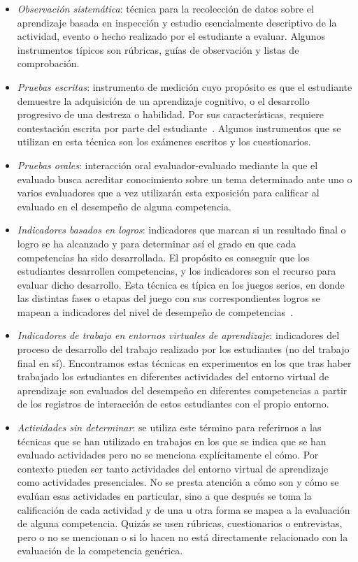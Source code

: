 \begin{itemize}
\item \emph{Observación sistemática}: técnica para la recolección de datos sobre el aprendizaje basada en inspección y estudio esencialmente descriptivo de la actividad, evento o hecho realizado por el estudiante a evaluar.  Algunos instrumentos típicos son rúbricas, guías de observación y listas de comprobación.
\item \emph{Pruebas escritas}: instrumento de medición cuyo propósito es que el estudiante demuestre la adquisición de un aprendizaje cognitivo, o el desarrollo progresivo de una destreza o habilidad. Por sus características, requiere contestación escrita por parte del estudiante~\cite{rojas2008prueba}. Algunos instrumentos que se utilizan en esta técnica son los exámenes escritos y los cuestionarios.
\item \emph{Pruebas orales}: interacción oral evaluador-evaluado mediante la que el evaluado busca acreditar conocimiento sobre un tema determinado ante uno o varios evaluadores que a vez utilizarán esta exposición para calificar al evaluado en el desempeño de alguna competencia. 
\item \emph{Indicadores basados en logros}: indicadores que marcan si un resultado final o logro se ha alcanzado y para determinar así el grado en que cada competencias ha sido desarrollada. El propósito es conseguir que los estudiantes desarrollen competencias, y los indicadores son el recurso para evaluar dicho desarrollo. Esta técnica es típica en los juegos serios, en donde las distintas fases o etapas del juego con sus correspondientes logros se mapean a indicadores del nivel de desempeño de competencias~\cite{balta2016coddii}.
\item \emph{Indicadores de trabajo en entornos virtuales de aprendizaje}: indicadores del proceso de desarrollo del trabajo realizado por los estudiantes (no del trabajo final en sí). Encontramos estas técnicas en experimentos en los que tras haber trabajado los estudiantes en diferentes actividades del entorno virtual de aprendizaje son evaluados del desempeño en diferentes competencias a partir de los registros de interacción de estos estudiantes con el propio entorno. 
\item \emph{Actividades sin determinar}: se utiliza este término para referirnos a las técnicas que se han utilizado en trabajos en los que se indica que se han evaluado actividades pero no se menciona explícitamente el cómo. Por contexto pueden ser tanto actividades del entorno virtual de aprendizaje como actividades presenciales. No se presta atención a cómo son y cómo se evalúan esas actividades en particular, sino a que después se toma la calificación de cada actividad y de una u otra forma se mapea a la evaluación de alguna competencia. Quizás se usen rúbricas, cuestionarios o entrevistas, pero o no se mencionan o si lo hacen no está directamente relacionado con la evaluación de la competencia genérica.
\end{itemize}

